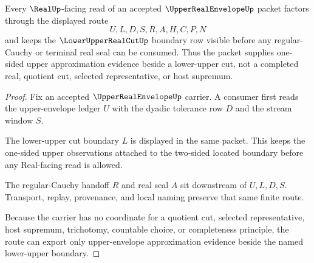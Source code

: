 \begin{theorem}
\label{thm:upper-real-envelope-lower-upper-cut-boundary}
Every $\RealUp$-facing read of an accepted $\UpperRealEnvelopeUp$ packet factors through the displayed route
$$
U,L,D,S,R,A,H,C,P,N
$$
and keeps the $\LowerUpperRealCutUp$ boundary row visible before any regular-Cauchy or terminal real seal can be consumed. Thus the packet supplies one-sided upper approximation evidence beside a lower-upper cut, not a completed real, quotient cut, selected representative, or host supremum.
\end{theorem}
\begin{proof}
Fix an accepted $\UpperRealEnvelopeUp$ carrier. A consumer first reads the upper-envelope ledger $U$ with the dyadic tolerance row $D$ and the stream window $S$.

The lower-upper cut boundary $L$ is displayed in the same packet. This keeps the one-sided upper observations attached to the two-sided located boundary before any Real-facing read is allowed.

The regular-Cauchy handoff $R$ and real seal $A$ sit downstream of $U,L,D,S$. Transport, replay, provenance, and local naming preserve that same finite route.

Because the carrier has no coordinate for a quotient cut, selected representative, host supremum, trichotomy, countable choice, or completeness principle, the route can export only upper-envelope approximation evidence beside the named lower-upper boundary.
\end{proof}


\begin{closurestatus}{\UpperRealEnvelopeUp}
  \theoryclosure{\seedClosure}
  \formalstatus{\unformalizedV}
\end{closurestatus}
